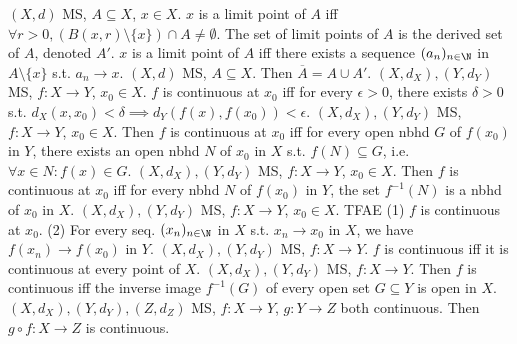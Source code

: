 $(X,d)$ MS, $A \subseteq X$, $x \in X$.
$x$ is a limit point of $A$ iff
$\forall r > 0, (B(x, r) \setminus \{x\}) \cap A \neq \emptyset$.
The set of limit points of $A$ is the derived set of $A$, denoted $A'$.
 $x$ is a limit point of $A$ iff
there exists a sequence $(a_n)_{n \in \N}$ in $A \setminus \{x\}$ s.t. $a_n \to x$.
 $(X,d)$ MS, $A \subseteq X$. Then $\overline{A} = A \cup A'$.
 $(X, d_X), (Y, d_Y)$ MS, $f: X \to Y$, $x_0 \in X$.
$f$ is continuous at $x_0$ iff
for every $\epsilon > 0$, there exists $\delta > 0$ s.t.
$d_X(x, x_0) < \delta \implies d_Y(f(x), f(x_0)) < \epsilon$.
 $(X, d_X), (Y, d_Y)$ MS, $f: X \to Y$, $x_0 \in X$.
Then $f$ is continuous at $x_0$ iff
for every open nbhd $G$ of $f(x_0)$ in $Y$,
there exists an open nbhd $N$ of $x_0$ in $X$ s.t. $f(N) \subseteq G$,
i.e. $\forall x \in N: f(x) \in G$.
 $(X, d_X), (Y, d_Y)$ MS, $f: X \to Y$, $x_0 \in X$.
Then $f$ is continuous at $x_0$ iff
for every nbhd $N$ of $f(x_0)$ in $Y$,
the set $f^{-1}(N)$ is a nbhd of $x_0$ in $X$.
 $(X, d_X), (Y, d_Y)$ MS, $f: X \to Y$, $x_0 \in X$. TFAE
(1) $f$ is continuous at $x_0$.
(2) For every seq. $(x_n)_{n \in \N}$ in $X$ s.t. $x_n \to x_0$ in $X$,
we have $f(x_n) \to f(x_0)$ in $Y$.
 $(X, d_X), (Y, d_Y)$ MS, $f: X \to Y$.
$f$ is continuous iff it is continuous at every point of $X$.
 $(X, d_X), (Y, d_Y)$ MS, $f: X \to Y$.
Then $f$ is continuous iff
the inverse image $f^{-1}(G)$ of every open set $G \subseteq Y$ is open in $X$.
 $(X, d_X), (Y, d_Y), (Z, d_Z)$ MS,
$f: X \to Y$, $g: Y \to Z$ both continuous.
Then $g \circ f: X \to Z$ is continuous.
